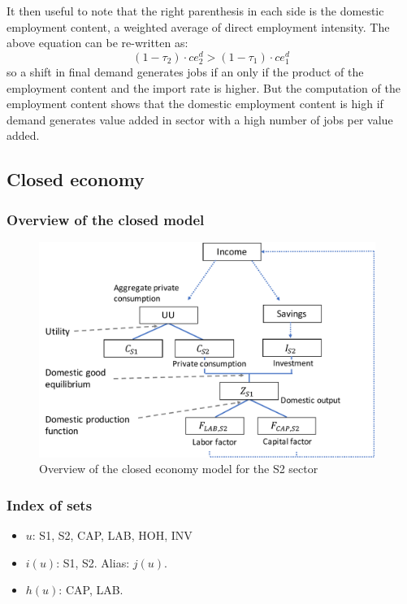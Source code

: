 It then useful to note that the right parenthesis in each side is the domestic employment content, a weighted average of direct employment intensity. The above equation can be re-written as:
$$(1-\tau_2) \cdot ce^d_2> (1-\tau_1) \cdot ce^d_1 $$
so a shift in final demand generates jobs if an only if the product of the employment content and the import rate is higher.
But the computation of the employment content shows that the domestic employment content is high if demand generates value added in sector with a high number of jobs per value added.

\clearpage

\subsection{Closed economy}
\label{app:closed_economy}

\subsubsection{Overview of the closed model}
\begin{figure}[!ht]
	\centering
	\includegraphics[height=7cm]{figures/overview_closed.pdf}
	\caption{Overview of the closed economy model for the S2 sector}
	\label{fig:overview_closed}
\end{figure}

\subsubsection{Index of sets}
\begin{itemize}
	\item $u$: S1, S2, CAP, LAB, HOH, INV
	\item $i(u)$: S1, S2. Alias: $j(u)$.
	\item $h(u)$: CAP, LAB.
\end{itemize}

